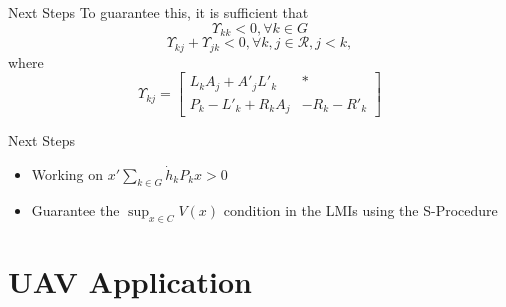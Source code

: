 \begin{frame}{Next Steps}
    To guarantee this, it is sufficient that
    \begin{equation} 
    \Upsilon_{kk} < 0, \forall k \in G
\end{equation}
\begin{equation} 
    \Upsilon_{kj} + \Upsilon_{jk} < 0, \forall k,j \in \mathcal{R}, j<k,
\end{equation}
where
\begin{equation}
    \Upsilon_{kj} = \begin{bmatrix}
    L_kA_j+A'_jL'_k & *\\
    P_k-L'_k+R_kA_j & -R_k-R'_k
    \end{bmatrix}
\end{equation}
\end{frame}

\begin{frame}{Next Steps}
\begin{itemize}
    \item Working on $x'\sum_{k \in G}\dot{h}_kP_kx > 0$
    \item Guarantee the $\sup_{x \in C}V(x)$ condition in the LMIs using the S-Procedure
\end{itemize}
    
\end{frame}

\section{UAV Application}

